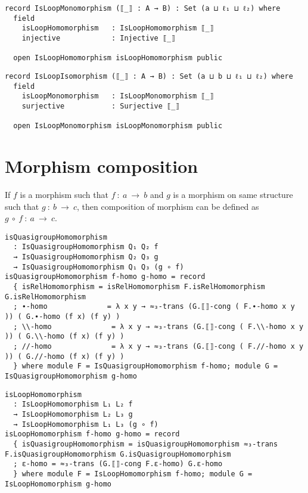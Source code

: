 \begin{verbatim}
record IsLoopMonomorphism (⟦_⟧ : A → B) : Set (a ⊔ ℓ₁ ⊔ ℓ₂) where
  field
    isLoopHomomorphism   : IsLoopHomomorphism ⟦_⟧
    injective            : Injective ⟦_⟧

  open IsLoopHomomorphism isLoopHomomorphism public
\end{verbatim}
\begin{verbatim}  
record IsLoopIsomorphism (⟦_⟧ : A → B) : Set (a ⊔ b ⊔ ℓ₁ ⊔ ℓ₂) where
  field
    isLoopMonomorphism   : IsLoopMonomorphism ⟦_⟧
    surjective           : Surjective ⟦_⟧

  open IsLoopMonomorphism isLoopMonomorphism public
\end{verbatim}
\section{Morphism composition}
If $f$ is a morphism such that $f\ :\ a \ \rightarrow \ b$ and $g$ is a morphism on same
structure such that $g\ :\ b\ \rightarrow \ c$, then composition of morphism can be
defined as $g \ ∘\ f\ :\ a \ \rightarrow \ c$.
\begin{verbatim}
isQuasigroupHomomorphism
  : IsQuasigroupHomomorphism Q₁ Q₂ f
  → IsQuasigroupHomomorphism Q₂ Q₃ g
  → IsQuasigroupHomomorphism Q₁ Q₃ (g ∘ f)
isQuasigroupHomomorphism f-homo g-homo = record
  { isRelHomomorphism = isRelHomomorphism F.isRelHomomorphism G.isRelHomomorphism
  ; ∙-homo              = λ x y → ≈₃-trans (G.⟦⟧-cong ( F.∙-homo x y )) ( G.∙-homo (f x) (f y) )
  ; \\-homo              = λ x y → ≈₃-trans (G.⟦⟧-cong ( F.\\-homo x y )) ( G.\\-homo (f x) (f y) )
  ; //-homo              = λ x y → ≈₃-trans (G.⟦⟧-cong ( F.//-homo x y )) ( G.//-homo (f x) (f y) )
  } where module F = IsQuasigroupHomomorphism f-homo; module G = IsQuasigroupHomomorphism g-homo
\end{verbatim}
\begin{verbatim}
isLoopHomomorphism
  : IsLoopHomomorphism L₁ L₂ f
  → IsLoopHomomorphism L₂ L₃ g
  → IsLoopHomomorphism L₁ L₃ (g ∘ f)
isLoopHomomorphism f-homo g-homo = record
  { isQuasigroupHomomorphism = isQuasigroupHomomorphism ≈₃-trans F.isQuasigroupHomomorphism G.isQuasigroupHomomorphism
  ; ε-homo = ≈₃-trans (G.⟦⟧-cong F.ε-homo) G.ε-homo
  } where module F = IsLoopHomomorphism f-homo; module G = IsLoopHomomorphism g-homo
\end{verbatim}

